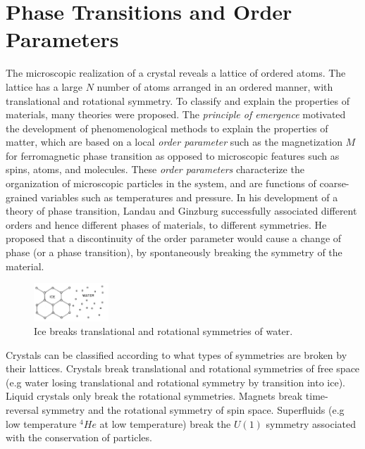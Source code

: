 \section{\label{sec:phases}Phase Transitions and Order Parameters}

The microscopic realization of a crystal reveals a lattice of ordered atoms. The lattice has a large $N$ number of atoms arranged in an ordered manner, with translational and rotational symmetry. To classify and explain the properties of materials, many theories were proposed. The \textit{principle of emergence} motivated the development of phenomenological methods to explain the properties of matter, which are based on a local \textit{order parameter} such as the magnetization $M$ for ferromagnetic phase transition as opposed to microscopic features such as spins, atoms, and molecules. These \textit{order parameters} characterize the organization of microscopic particles in the system, and are functions of coarse-grained variables such as temperatures and pressure. In his development of a theory of phase transition, Landau and Ginzburg \cite{hohenberg_introduction_2015,ter_haar_29_1965, wen_colloquium_2017} successfully associated different orders and hence different phases of materials, to different symmetries. He proposed that a discontinuity of the order parameter would cause a change of phase (or a phase transition), by spontaneously breaking the symmetry of the material. 

\begin{figure}[thpb] %
    \centering
    \includegraphics[width=0.25\textwidth]{figs/water-vs-ice.png}
    \caption{\label{fig:water-vs-ice}Ice breaks translational and rotational symmetries of water.}
\end{figure}

Crystals can be classified according to what types of symmetries are broken by their lattices. Crystals break translational and rotational symmetries of free space (e.g water losing translational and rotational symmetry by transition into ice). Liquid crystals only break the rotational symmetries. Magnets break time-reversal symmetry and the rotational symmetry of spin space. Superfluids (e.g low temperature $^{4}He$ at low temperature) break the $U(1)$ symmetry associated with the conservation of particles. 